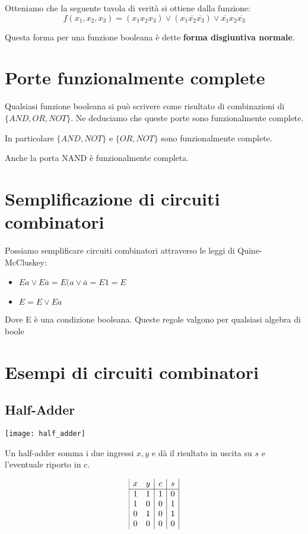 \documentclass[a4paper]{article}
\begin{document}
Otteniamo che la seguente tavola di verità si ottiene dalla funzione: $$f(x_1, x_2, x_3) = (x_1 x_2 x_3) \lor (x_1 \overline{x_2} \overline{x_3}) \lor \overline{x_1} x_2 \overline{x_3}$$

Questa forma per una funzione booleana è dette \textbf{forma disgiuntiva normale}.

\section{Porte funzionalmente complete}

Qualsiasi funzione booleana si può scrivere come risultato di combinazioni di $\{AND, OR, NOT\}$. Ne deduciamo che queste porte sono funzionalmente complete.

In particolare $\{AND, NOT\}$ e $\{OR, NOT\}$ sono funzionalmente complete.

Anche la porta NAND è funzionalmente completa.

\section{Semplificazione di circuiti combinatori}

Possiamo semplificare circuiti combinatori attraverso le leggi di Quine-McCluskey:

\begin{itemize}
	\item $Ea \lor E\overline{a} = E(a \lor \overline{a} = E1 = E$
	\item $E=E\lor Ea$
\end{itemize}

Dove E è una condizione booleana. Queste regole valgono per qualsiasi algebra di boole

\section{Esempi di circuiti combinatori}

\subsection{Half-Adder}

\texttt{[image: half\_adder]}

Un half-adder somma i due ingressi $x,y$ e dà il risultato in uscita su $s$ e l'eventuale riporto in $c$.

$$
\begin{array}{|c c |c|c|}
	x & y & c & s\\
	\hline
	1 & 1 & 1 & 0\\
	1 & 0 & 0 & 1\\
	0 & 1 & 0 & 1\\
	0 & 0 & 0& 0\\
\end{array}
$$
\end{document}

